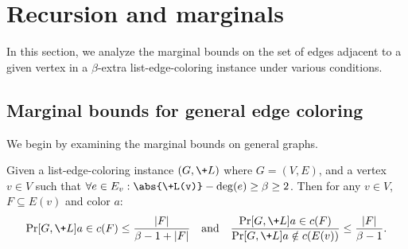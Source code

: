 \section{Recursion and marginals}\label{sec:marginals}
In this section, we analyze the marginal bounds on the set of edges adjacent to a given vertex in a $\beta$-extra list-edge-coloring instance under various conditions.
\subsection{Marginal bounds for general edge coloring}
We begin by examining the marginal bounds on general graphs.
\begin{lemma}\label{lem:claw-marginal-generalized}
     Given a list-edge-coloring instance $(G, \+L)$ where $G=(V, E)$,
     and a vertex $v\in V$ such that $\forall e\in E_{v}: \abs{\+L(v)}-\deg(e) \ge \beta\ge 2$.
    Then for any $v\in V$, $F\subseteq E(v)$ and color $a$:
    \[\Pr[G,\+L]{a\in c(F)} \le \frac{|F|}{\beta - 1 + |F|}\quad\mbox{and}\quad \frac{\Pr[G,\+L]{a\in c(F)}}{\Pr[G,\+L]{a \notin c(E(v))}} \le \frac{|F|}{\beta - 1}.\]
\end{lemma}

